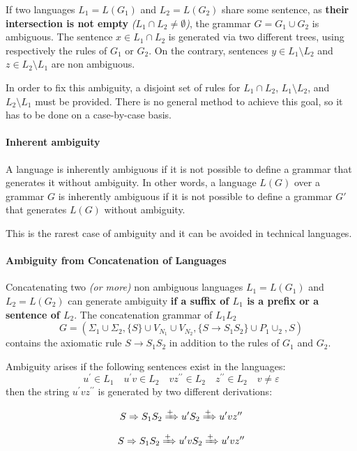 \documentclass[english]{article}
\begin{document}
If two languages \(L_1 = L(G_1)\) and \(L_2 = L(G_2)\) share some sentence, as \textbf{their intersection is not empty} \textit{(\(L_1 \cap L_2 \neq \emptyset\))}, the grammar \(G = G_1 \cup G_2\) is ambiguous.
The sentence \(x \in L_1 \cap L_2\) is generated via two different trees, using respectively the rules of \(G_1\) or \(G_2\).
On the contrary, sentences \(y \in L_1 \setminus L_2\) and \(z \in L_2 \setminus L_1\) are non ambiguous.

In order to fix this ambiguity, a disjoint set of rules for \(L_1 \cap L_2\), \(L_1 \setminus L_2\), and \(L_2 \setminus L_1\) must be provided.
There is no general method to achieve this goal, so it has to be done on a case-by-case basis.

\paragraph{Inherent ambiguity}

A language is inherently ambiguous if it is not possible to define a grammar that generates it without ambiguity.
In other words, a language \(L(G)\) over a grammar \(G\) is inherently ambiguous if it is not possible to define a grammar \(G'\) that generates \(L(G)\) without ambiguity.

This is the rarest case of ambiguity and it can be avoided in technical languages.

\paragraph{Ambiguity from Concatenation of Languages}

Concatenating two \textit{(or more)} non ambiguous languages \(L_1 = L(G_1)\) and \(L_2 = L(G_2)\) can generate ambiguity \textbf{if a suffix of \(L_1\) is a prefix or a sentence of \(L_2\)}.
The concatenation grammar  of \(L_1 L_2\)
\[G = \left(\Sigma_1 \cup \Sigma_2, \{S\} \cup V_{N_1} \cup V_{N_2}, \{S \rightarrow S_1 S_2\} \cup P_1 \cup _2, S\right)\]
contains the axiomatic rule \(S \rightarrow S_1 S_2\) in addition to the rules of \(G_1\) and \(G_2\).

Ambiguity arises if the following sentences exist in the languages:
\[ u^\prime \in L_1 \quad u^\prime v \in L_2 \quad v z^{\prime \prime} \in L_2 \quad z^{\prime \prime} \in L_2 \quad v \neq \varepsilon \]
then the string \(u^\prime v z^{\prime \prime}\) is generated by two different derivations:

\[S \Rightarrow S_1 S_2 \xRightarrow{+} u^\prime S_2 \xRightarrow{+} u^\prime v z^{\prime \prime}\]
\[S \Rightarrow S_1 S_2 \xRightarrow{+} u^\prime v S_2 \xRightarrow{+} u^\prime v z^{\prime \prime}\]
\end{document}
